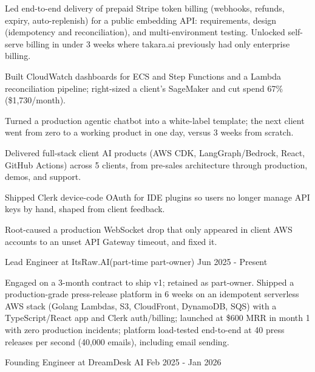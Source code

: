 \documentclass[10pt, a4paper]{awesome-cv}
\begin{document}
    \begin{cvitems}
        \item Led end-to-end delivery of prepaid Stripe token billing (webhooks, refunds, expiry, auto-replenish) for a public embedding API: requirements, design (idempotency and reconciliation), and multi-environment testing. Unlocked self-serve billing in under 3 weeks where takara.ai previously had only enterprise billing.
        \item Built CloudWatch dashboards for ECS and Step Functions and a Lambda reconciliation pipeline; right-sized a client's SageMaker and cut spend 67\% (\$1{,}730/month).
        \item Turned a production agentic chatbot into a white-label template; the next client went from zero to a working product in one day, versus 3 weeks from scratch.
        \item Delivered full-stack client AI products (AWS CDK, LangGraph/Bedrock, React, GitHub Actions) across 5 clients, from pre-sales architecture through production, demos, and support.
        \item Shipped Clerk device-code OAuth for IDE plugins so users no longer manage API keys by hand, shaped from client feedback.
        \item Root-caused a production WebSocket drop that only appeared in client AWS accounts to an unset API Gateway timeout, and fixed it.
    \end{cvitems}

    \cventry
    {Lead Engineer at ItsRaw.AI\linebreak (part-time part-owner)}
    {Jun 2025 - Present}

    \begin{cvitems}
        \item Engaged on a 3-month contract to ship v1; retained as part-owner. Shipped a production-grade press-release platform in 6 weeks on an idempotent serverless AWS stack (Golang Lambdas, S3, CloudFront, DynamoDB, SQS) with a TypeScript/React app and Clerk auth/billing; launched at \$600 MRR in month 1 with zero production incidents; platform load-tested end-to-end at 40 press releases per second (40{,}000 emails), including email sending.
    \end{cvitems}

    \cventry
    {Founding Engineer at DreamDesk AI}
    {Feb 2025 - Jan 2026}
\end{document}
